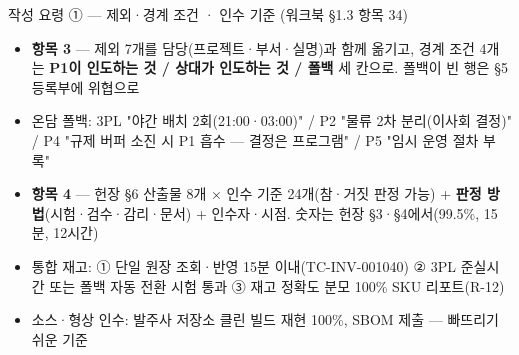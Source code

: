 \begin{frame}{작성 요령 ① — 제외·경계 조건 · 인수 기준 (워크북 §1.3 항목 3\til{}4)}
\begin{itemize}
\item \textbf{항목 3} — 제외 7개를 담당(프로젝트·부서·실명)과 함께 옮기고, 경계 조건 4개는 \textbf{P1이 인도하는 것 / 상대가 인도하는 것 / 폴백} 세 칸으로. 폴백이 빈 행은 §5 등록부에 위협으로
\item 온담 폴백: 3PL "야간 배치 2회(21:00·03:00)" / P2 "물류 2차 분리(이사회 결정)" / P4 "규제 버퍼 소진 시 P1 흡수 — 결정은 프로그램" / P5 "임시 운영 절차 부록"
\item \textbf{항목 4} — 헌장 §6 산출물 8개 × 인수 기준 2\til{}4개(참·거짓 판정 가능) + \textbf{판정 방법}(시험·검수·감리·문서) + 인수자·시점. 숫자는 헌장 §3·§4에서(99.5\%, 15분, 12시간)
\item 통합 재고: ① 단일 원장 조회·반영 15분 이내(TC-INV-001\til{}040) ② 3PL 준실시간 또는 폴백 자동 전환 시험 통과 ③ 재고 정확도 분모 100\% SKU 리포트(R-12)
\item 소스·형상 인수: 발주사 저장소 클린 빌드 재현 100\%, SBOM 제출 — 빠뜨리기 쉬운 기준
\end{itemize}
\end{frame}

